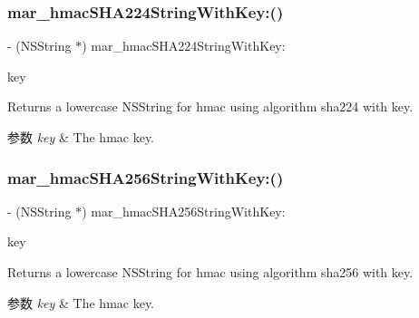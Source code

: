\subsubsection{\texorpdfstring{mar\+\_\+hmac\+S\+H\+A224\+String\+With\+Key\+:()}{mar\_hmacSHA224StringWithKey:()}}
{\footnotesize\ttfamily -\/ (N\+S\+String $\ast$) mar\+\_\+hmac\+S\+H\+A224\+String\+With\+Key\+: \begin{DoxyParamCaption}\item[{(N\+S\+String $\ast$)}]{key }\end{DoxyParamCaption}}

Returns a lowercase N\+S\+String for hmac using algorithm sha224 with key. 
\begin{DoxyParams}{参数}
{\em key} & The hmac key. \\
\hline
\end{DoxyParams}
\mbox{\label{category_n_s_string_07_m_a_r_e_x_08_a4d10fec022578f038581721f519e0c66}} 
\subsubsection{\texorpdfstring{mar\+\_\+hmac\+S\+H\+A256\+String\+With\+Key\+:()}{mar\_hmacSHA256StringWithKey:()}}
{\footnotesize\ttfamily -\/ (N\+S\+String $\ast$) mar\+\_\+hmac\+S\+H\+A256\+String\+With\+Key\+: \begin{DoxyParamCaption}\item[{(N\+S\+String $\ast$)}]{key }\end{DoxyParamCaption}}

Returns a lowercase N\+S\+String for hmac using algorithm sha256 with key. 
\begin{DoxyParams}{参数}
{\em key} & The hmac key. \\
\hline
\end{DoxyParams}
\mbox{\label{category_n_s_string_07_m_a_r_e_x_08_ae10b061e5a671bd2d401ea96d685edcc}} 
